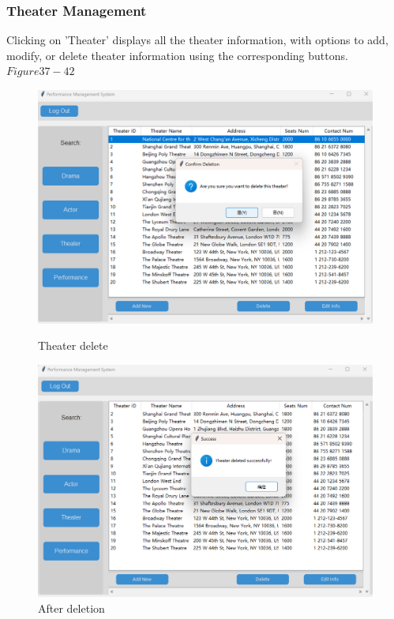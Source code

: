 \documentclass[12pt]{article}
\begin{document}
\subsubsection{Theater Management}
\par Clicking on 'Theater' displays all the theater information, with options to add, modify, or delete theater information using the corresponding buttons.\(Figure37-42\)
\begin{figure}[H]
    \centering
    \begin{minipage}{0.48\textwidth}
        \centering
        \includegraphics[width=\textwidth]{37.png}

        \caption{Theater delete} 
        \label{Figure 37}
    \end{minipage}
    \hfill
    \begin{minipage}{0.48\textwidth}
        \centering
        \includegraphics[width=\textwidth]{38.png}
        \caption{After deletion}
        \label{Figure 38}
    \end{minipage}
\end{figure}
\end{document}
